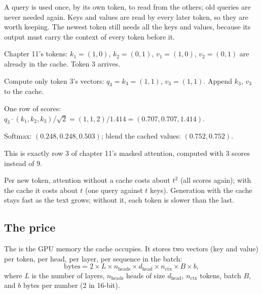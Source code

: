 \begin{remark}
A query is used once, by its own token, to read from the others; old queries are never needed again. Keys and values are read by every later token, so they are worth keeping. The newest token still needs all the keys and values, because its output must carry the context of every token before it.
\end{remark}

\begin{example}
Chapter 11's tokens: $k_1 = (1, 0)$, $k_2 = (0, 1)$, $v_1 = (1, 0)$, $v_2 = (0, 1)$ are already in the cache. Token 3 arrives.
\begin{steps}
  \item Compute only token 3's vectors: $q_3 = k_3 = (1, 1)$, $v_3 = (1, 1)$. Append $k_3$, $v_3$ to the cache.
  \item One row of scores: $q_3 \cdot (k_1, k_2, k_3)/\sqrt2 = (1, 1, 2)/1.414 = (0.707, 0.707, 1.414)$.
  \item Softmax: $(0.248, 0.248, 0.503)$; blend the cached values: $(0.752, 0.752)$.
  \item This is exactly row 3 of chapter 11's masked attention, computed with 3 scores instead of 9.
\end{steps}
\end{example}

\begin{result}
Per new token, attention without a cache costs about $t^2$ (all scores again); with the cache it costs about $t$ (one query against $t$ keys). Generation with the cache stays fast as the text grows; without it, each token is slower than the last.
\end{result}

\subsection*{The price}

\begin{definition}
The  is the GPU memory the cache occupies. It stores two vectors (key and value) per token, per head, per layer, per sequence in the batch:
\[
\text{bytes} = 2 \times L \times n_{\text{heads}} \times d_{\text{head}} \times n_{\text{ctx}} \times B \times b,
\]
where $L$ is the number of layers, $n_{\text{heads}}$ heads of size $d_{\text{head}}$, $n_{\text{ctx}}$ tokens, batch $B$, and $b$ bytes per number (2 in 16-bit).
\end{definition}

